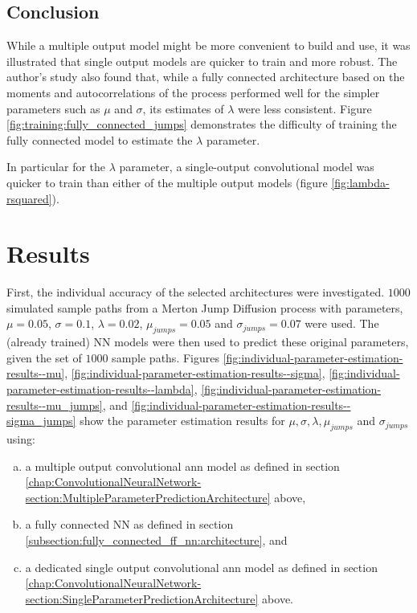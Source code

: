 \documentclass[11pt,oneside,openany,a4paper,english, report, goldenblock
]{usthesis}
\begin{document}
\section{Conclusion}
While a multiple output model might be more convenient to build and use, it was illustrated that single output models are quicker to train and more robust. The author's study also found that, while a fully connected architecture based on the moments and autocorrelations of the process performed well for the simpler parameters such as $\mu$ and $\sigma$, its estimates of $\lambda$ were less consistent. Figure \ref{fig:training:fully_connected_jumps} demonstrates the difficulty of training the fully connected model to estimate the $\lambda$ parameter.

In particular for the $\lambda$ parameter, a single-output convolutional model was quicker to train than either of the multiple output models (figure \ref{fig:lambda-rsquared}).

\chapter{Results}
\label{chapter:results}

First, the individual accuracy of the selected architectures were investigated. $1000$ simulated sample paths from a Merton Jump Diffusion process with parameters, $\mu = 0.05$, $\sigma = 0.1$, $\lambda = 0.02$, $\mu_{jumps} = 0.05$ and $\sigma_{jumps} = 0.07$ were used. The (already trained) NN models were then used to predict these original parameters, given the set of $1000$ sample paths. Figures \ref{fig:individual-parameter-estimation-results--mu}, \ref{fig:individual-parameter-estimation-results--sigma}, \ref{fig:individual-parameter-estimation-results--lambda}, \ref{fig:individual-parameter-estimation-results--mu_jumps}, and \ref{fig:individual-parameter-estimation-results--sigma_jumps} show the parameter estimation results for $\mu, \sigma, \lambda, \mu_{jumps}$ and $\sigma_{jumps}$ using: 

\begin{enumerate}[a)]
	\itemsep0em 
	\item  a multiple output convolutional \acrshort{ann} model as defined in section \ref{chap:ConvolutionalNeuralNetwork-section:MultipleParameterPredictionArchitecture} above,
	\item  a fully connected NN as defined in section \ref{subsection:fully_connected_ff_nn:architecture}, and
	\item  a dedicated single output convolutional \acrshort{ann} model as defined in section \ref{chap:ConvolutionalNeuralNetwork-section:SingleParameterPredictionArchitecture} above.
\end{enumerate}
\end{document}
